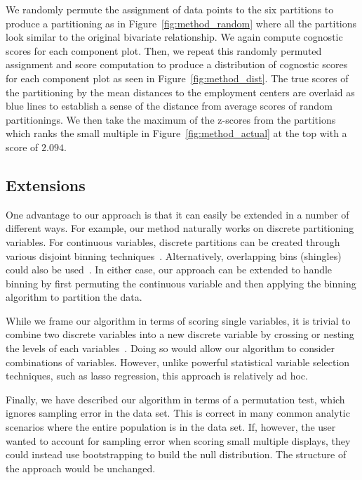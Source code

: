 We randomly permute the assignment of data points to the six partitions to produce a partitioning as in Figure~\ref{fig:method_random} where all the partitions look similar to the original bivariate relationship. We again compute cognostic scores for each component plot. Then, we repeat this randomly permuted assignment and score computation to produce a distribution of cognostic scores for each component plot as seen in Figure~\ref{fig:method_dist}. The true scores of the partitioning by the mean distances to the employment centers are overlaid as blue lines to establish a sense of the distance from average scores of random partitionings. We then take the maximum of the z-scores from the partitions which ranks the small multiple in Figure~\ref{fig:method_actual} at the top with a score of $2.094$.

\subsection{Extensions}
One advantage to our approach is that it can easily be extended in a number of different ways. For example, our method naturally works on discrete partitioning variables. For continuous variables, discrete partitions can be created through various disjoint binning techniques~\cite{Freedman1981,Scott2009}. Alternatively, overlapping bins (shingles) could also be used~\cite{Becker1996}. In either case, our approach can be extended to handle binning by first permuting the continuous variable and then applying the binning algorithm to partition the data.

While we frame our algorithm in terms of scoring single variables, it is trivial to combine two discrete variables into a new discrete variable by crossing or nesting the levels of each variables~\cite{Wilkinson2005GG,Stolte2002}. Doing so would allow our algorithm to consider combinations of variables. However, unlike powerful statistical variable selection techniques, such as lasso regression, this approach is relatively ad hoc.

Finally, we have described our algorithm in terms of a permutation test, which ignores sampling error in the data set. This is correct in many common analytic scenarios where the entire population is in the data set. If, however, the user wanted to account for sampling error when scoring small multiple displays, they could instead use bootstrapping to build the null distribution. The structure of the approach would be unchanged.

